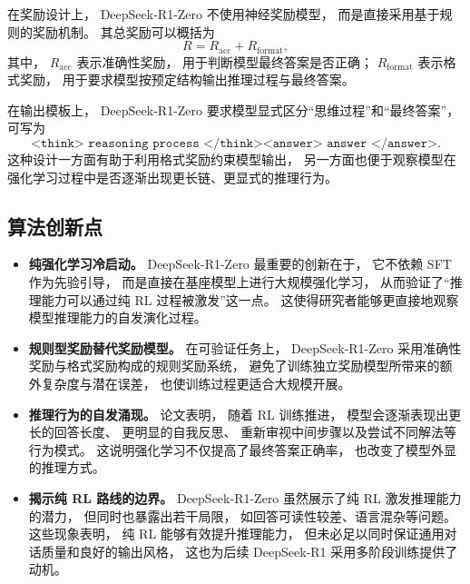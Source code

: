 \documentclass[UTF8]{ctexart}
\begin{document}
在奖励设计上，
DeepSeek-R1-Zero 不使用神经奖励模型，
而是直接采用基于规则的奖励机制。
其总奖励可以概括为
\begin{equation}
R = R_{\mathrm{acc}} + R_{\mathrm{format}},
\end{equation}
其中，
$R_{\mathrm{acc}}$ 表示准确性奖励，
用于判断模型最终答案是否正确；
$R_{\mathrm{format}}$ 表示格式奖励，
用于要求模型按预定结构输出推理过程与最终答案。

在输出模板上，
DeepSeek-R1-Zero 要求模型显式区分“思维过程”和“最终答案”，
可写为
\begin{equation}
\texttt{<think> reasoning process </think><answer> answer </answer>}.
\end{equation}
这种设计一方面有助于利用格式奖励约束模型输出，
另一方面也便于观察模型在强化学习过程中是否逐渐出现更长链、更显式的推理行为。

\subsection{算法创新点}

\begin{itemize}
    \item \textbf{纯强化学习冷启动。}
    DeepSeek-R1-Zero 最重要的创新在于，
    它不依赖 SFT 作为先验引导，
    而是直接在基座模型上进行大规模强化学习，
    从而验证了“推理能力可以通过纯 RL 过程被激发”这一点。
    这使得研究者能够更直接地观察模型推理能力的自发演化过程。
    
    \item \textbf{规则型奖励替代奖励模型。}
    在可验证任务上，
    DeepSeek-R1-Zero 采用准确性奖励与格式奖励构成的规则奖励系统，
    避免了训练独立奖励模型所带来的额外复杂度与潜在误差，
    也使训练过程更适合大规模开展。

    \item \textbf{推理行为的自发涌现。}
    论文表明，
    随着 RL 训练推进，
    模型会逐渐表现出更长的回答长度、
    更明显的自我反思、
    重新审视中间步骤以及尝试不同解法等行为模式。
    这说明强化学习不仅提高了最终答案正确率，
    也改变了模型外显的推理方式。

    \item \textbf{揭示纯 RL 路线的边界。}
    DeepSeek-R1-Zero 虽然展示了纯 RL 激发推理能力的潜力，
    但同时也暴露出若干局限，
    如回答可读性较差、语言混杂等问题。
    这些现象表明，
    纯 RL 能够有效提升推理能力，
    但未必足以同时保证通用对话质量和良好的输出风格，
    这也为后续 DeepSeek-R1 采用多阶段训练提供了动机。
\end{itemize}
\end{document}
